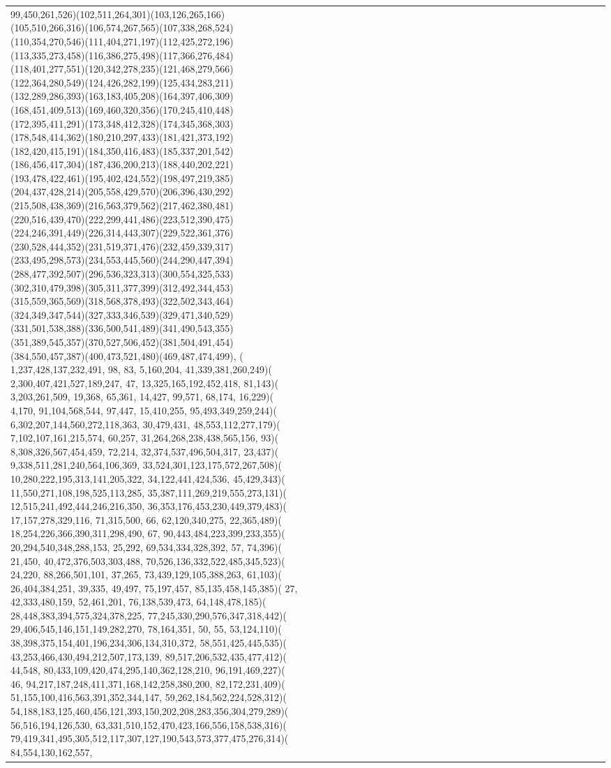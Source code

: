 \documentclass[varwidth=\maxdimen,border=10]{standalone}
\begin{document}
\begin{tabular}{@{}l@{}l@{}l@{}l@{}l@{}l@{}l@{}l@{}l@{}l@{}l@{}l@{}l@{}l@{}l@{}l@{}l@{}l@{}l@{}l@{}l@{}l@{}l@{}l@{}l@{}l@{}l@{}l@{}l@{}l@{}l@{}l@{}}
99,450,261,526)(102,511,264,301)(103,126,265,166)(105,510,266,316)(106,574,267,565)(107,338,268,524)(110,354,270,546)(111,404,271,197)(112,425,272,196)(113,335,273,458)(116,386,275,498)(117,366,276,484)(118,401,277,551)(120,342,278,235)(121,468,279,566)(122,364,280,549)(124,426,282,199)(125,434,283,211)(132,289,286,393)(163,183,405,208)(164,397,406,309)(168,451,409,513)(169,460,320,356)(170,245,410,448)(172,395,411,291)(173,348,412,328)(174,345,368,303)(178,548,414,362)(180,210,297,433)(181,421,373,192)(182,420,415,191)(184,350,416,483)(185,337,201,542)(186,456,417,304)(187,436,200,213)(188,440,202,221)(193,478,422,461)(195,402,424,552)(198,497,219,385)(204,437,428,214)(205,558,429,570)(206,396,430,292)(215,508,438,369)(216,563,379,562)(217,462,380,481)(220,516,439,470)(222,299,441,486)(223,512,390,475)(224,246,391,449)(226,314,443,307)(229,522,361,376)(230,528,444,352)(231,519,371,476)(232,459,339,317)(233,495,298,573)(234,553,445,560)(244,290,447,394)(288,477,392,507)(296,536,323,313)(300,554,325,533)(302,310,479,398)(305,311,377,399)(312,492,344,453)(315,559,365,569)(318,568,378,493)(322,502,343,464)(324,349,347,544)(327,333,346,539)(329,471,340,529)(331,501,538,388)(336,500,541,489)(341,490,543,355)(351,389,545,357)(370,527,506,452)(381,504,491,454)(384,550,457,387)(400,473,521,480)(469,487,474,499), (  1,237,428,137,232,491, 98, 83,  5,160,204, 41,339,381,260,249)(  2,300,407,421,527,189,247, 47, 13,325,165,192,452,418, 81,143)(  3,203,261,509, 19,368, 65,361, 14,427, 99,571, 68,174, 16,229)(  4,170, 91,104,568,544, 97,447, 15,410,255, 95,493,349,259,244)(  6,302,207,144,560,272,118,363, 30,479,431, 48,553,112,277,179)(  7,102,107,161,215,574, 60,257, 31,264,268,238,438,565,156, 93)(  8,308,326,567,454,459, 72,214, 32,374,537,496,504,317, 23,437)(  9,338,511,281,240,564,106,369, 33,524,301,123,175,572,267,508)( 10,280,222,195,313,141,205,322, 34,122,441,424,536, 45,429,343)( 11,550,271,108,198,525,113,285, 35,387,111,269,219,555,273,131)( 12,515,241,492,444,246,216,350, 36,353,176,453,230,449,379,483)( 17,157,278,329,116, 71,315,500, 66, 62,120,340,275, 22,365,489)( 18,254,226,366,390,311,298,490, 67, 90,443,484,223,399,233,355)( 20,294,540,348,288,153, 25,292, 69,534,334,328,392, 57, 74,396)( 21,450, 40,472,376,503,303,488, 70,526,136,332,522,485,345,523)( 24,220, 88,266,501,101, 37,265, 73,439,129,105,388,263, 61,103)( 26,404,384,251, 39,335, 49,497, 75,197,457, 85,135,458,145,385)( 27, 42,333,480,159, 52,461,201, 76,138,539,473, 64,148,478,185)( 28,448,383,394,575,324,378,225, 77,245,330,290,576,347,318,442)( 29,406,545,146,151,149,282,270, 78,164,351, 50, 55, 53,124,110)( 38,398,375,154,401,196,234,306,134,310,372, 58,551,425,445,535)( 43,253,466,430,494,212,507,173,139, 89,517,206,532,435,477,412)( 44,548, 80,433,109,420,474,295,140,362,128,210, 96,191,469,227)( 46, 94,217,187,248,411,371,168,142,258,380,200, 82,172,231,409)( 51,155,100,416,563,391,352,344,147, 59,262,184,562,224,528,312)( 54,188,183,125,460,456,121,393,150,202,208,283,356,304,279,289)( 56,516,194,126,530, 63,331,510,152,470,423,166,556,158,538,316)( 79,419,341,495,305,512,117,307,127,190,543,573,377,475,276,314)( 84,554,130,162,557, 
\end{tabular}
\end{document}
